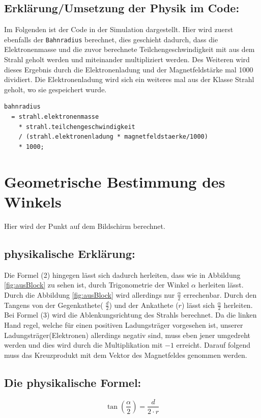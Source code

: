 \subsection{Erklärung/Umsetzung der Physik im Code:}

Im Folgenden ist der Code in der Simulation dargestellt. Hier wird zuerst ebenfalls der \lstinline$Bahnradius$ berechnet, dies geschieht dadurch, dass die Elektronenmasse und die zuvor berechnete Teilchengeschwindigkeit mit aus dem Strahl geholt werden und miteinander multipliziert werden. Des Weiteren wird dieses Ergebnis durch die Elektronenladung und der Magnetfeldstärke mal 1000 dividiert. Die Elektronenladung wird sich ein weiteres mal aus der Klasse Strahl geholt, wo sie gespeichert wurde.
\begin{lstlisting}
bahnradius
  = strahl.elektronenmasse
    * strahl.teilchengeschwindigkeit
    / (strahl.elektronenladung * magnetfeldstaerke/1000)
    * 1000;
\end{lstlisting}

\section{Geometrische Bestimmung des Winkels}

Hier wird der Punkt auf dem Bildschirm berechnet.
\subsection{physikalische Erklärung:}
Die Formel (2) hingegen lässt sich dadurch herleiten, dass wie in Abbildung \ref{fig:ausBlock} zu sehen ist, durch Trigonometrie der Winkel $\alpha$ herleiten lässt. Durch die Abbildung \ref{fig:ausBlock} wird allerdings nur $\frac{\alpha}{2}$ errechenbar. Durch den Tangens von der Gegenkathete( $ \frac{d}{2}$) und der Ankathete ($ r $) lässt sich $ \frac{\alpha}{2}$ herleiten. Bei Formel (3) wird die Ablenkungsrichtung des Strahls berechnet. Da die linken Hand regel, welche für einen positiven Ladungsträger vorgesehen ist, unserer Ladungsträger(Elektronen) allerdings negativ sind, muss eben jener umgedreht werden und dies wird durch die Multiplikation mit $ -1 $ erreicht. Darauf folgend muss das Kreuzprodukt mit dem Vektor des Magnetfeldes genommen werden.
\subsection{Die physikalische Formel:}
\begin{equation}
    \label{eq:tan}
    \tan(\frac{\alpha}{2}) = \frac{d}{2 \cdot r}
\end{equation}

